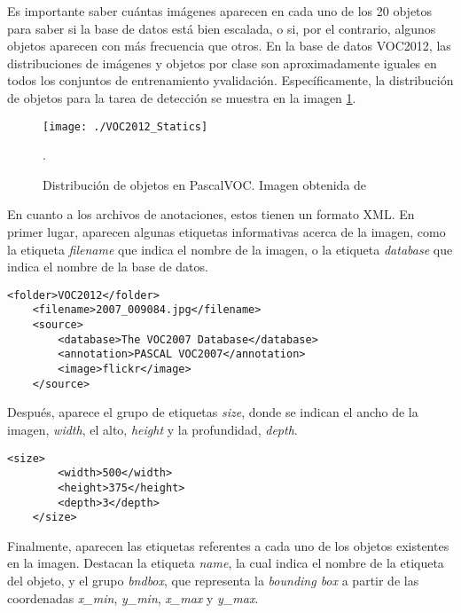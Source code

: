 \documentclass[a4paper, 12pt, spanish, chapterprefix, numbers=noenddot]{book}
\begin{document}
Es importante saber cuántas imágenes aparecen en cada uno de los 20 objetos para saber si la base de datos está bien escalada, o si, por el contrario, algunos objetos aparecen con más frecuencia que otros. En la base de datos VOC2012, las distribuciones de imágenes y objetos por clase son aproximadamente iguales en todos los conjuntos de entrenamiento yvalidación. Específicamente, la distribución de objetos para la tarea de detección se muestra en la imagen \ref{VOC2012_Statics}.

\begin{figure}[H]
\begin{center}
\texttt{[image: ./VOC2012\_Statics]}
\caption{Distribución de objetos en PascalVOC. Imagen obtenida de \cite{PascalVocData}}.
\label{VOC2012_Statics}
\end{center}
\end{figure}

En cuanto a los archivos de anotaciones, estos tienen un formato XML. En primer lugar, aparecen algunas etiquetas informativas acerca de la imagen, como la etiqueta \textit{filename} que indica el nombre de la imagen, o la etiqueta \textit{database} que indica el nombre de la base de datos.\\

\begin{lstlisting}[frame=single]
	<folder>VOC2012</folder>
	<filename>2007_009084.jpg</filename>
	<source>
		<database>The VOC2007 Database</database>
		<annotation>PASCAL VOC2007</annotation>
		<image>flickr</image>
	</source>
\end{lstlisting}


Después, aparece el grupo de etiquetas \textit{size}, donde se indican el ancho de la imagen, \textit{width}, el alto, \textit{height} y la profundidad, \textit{depth}.\\

\begin{lstlisting}[frame=single]
	<size>
		<width>500</width>
		<height>375</height>
		<depth>3</depth>
	</size>
\end{lstlisting}

Finalmente, aparecen las etiquetas referentes a cada uno de los objetos existentes en la imagen. Destacan la etiqueta \textit{name}, la cual indica el nombre de la etiqueta del objeto, y el grupo \textit{bndbox}, que representa la \textit{bounding box} a partir de las coordenadas \textit{x\_{min}}, \textit{y\_{min}}, \textit{x\_{max}} y \textit{y\_{max}}.\\
\end{document}
